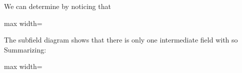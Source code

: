 \documentclass[11pt,oneside]{article}
\begin{document}
\begin{BookBody}
We can determine  by noticing that

\begin{center}\begin{adjustbox}{max width=\linewidth}\end{adjustbox}\end{center}

\noindent The subfield diagram shows that there is only one intermediate field  with  so  Summarizing:

\begin{center}\begin{adjustbox}{max width=\linewidth}\end{adjustbox}\end{center}

\end{BookBody}

\BookNarrativetrue
\end{document}
